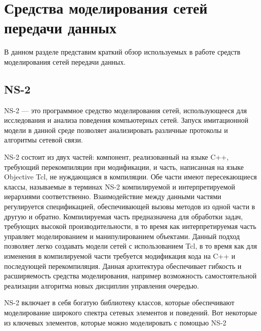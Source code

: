 
\chapter{Средства моделирования сетей передачи данных}
\label{chap1}

В данном разделе представим краткий обзор используемых в работе средств моделирования сетей
передачи данных.

\section{NS-2}
\label{chap1:sec1}

NS-2 — это программное средство моделирования
сетей, использующееся для исследования и анализа поведения
компьютерных сетей.  Запуск имитационной модели в данной среде
позволяет анализировать различные протоколы и алгоритмы сетевой связи.

NS-2 состоит из двух частей: компонент, реализованный на языке C++, 
требующий перекомпиляции при модификации, и часть, написанная на языке Objective Tcl,
не нуждающаяся в компиляции. Обе части имеют пересекающиеся классы, называемые в 
терминах NS-2 компилируемой и интерпретируемой иерархиями соответственно. 
Взаимодействие между данными частями регулируется спецификацией, обеспечивающей вызовы 
методов из одной части в другую и обратно. Компилируемая часть предназначена для обработки задач, 
требующих высокой производительности, в то время как интерпретируемая часть управляет 
моделированием и манипулированием объектами. Данный подход позволяет легко создавать модели сетей 
с использованием Tcl, в то время как для изменения в компилируемой части требуется модификация 
кода на C++ и последующей перекомпиляция. Данная архитектура обеспечивает гибкость и расширяемость 
средства моделирования, например возможность самостоятельной реализации алгоритма новых дисциплин управления очередью. 

NS-2 включает в себя богатую библиотеку классов, которые обеспечивают моделирование широкого спектра сетевых 
элементов и поведений. Вот некоторые из ключевых элементов, которые можно моделировать с помощью NS-2

